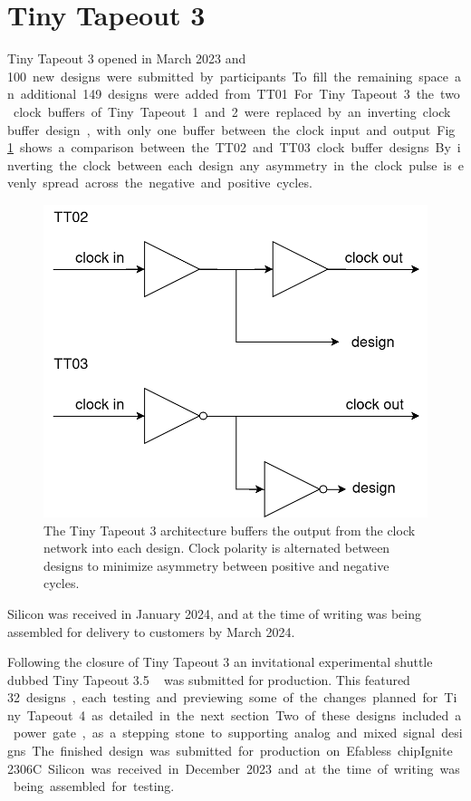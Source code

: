 \section{Tiny Tapeout 3}
\label{sec:tinytapeout3}

Tiny Tapeout 3 opened in March 2023 and \qty{100} new designs were submitted by participants. To fill the remaining space an additional \qty{149} designs were added from TT01.

For Tiny Tapeout 3 the two clock buffers of Tiny Tapeout 1 and 2 were replaced by an inverting clock buffer design, with only one buffer between the clock input and output. Fig. ~\ref{fig:TT02_vs_TT03} shows a comparison between the TT02 and TT03 clock buffer designs. By inverting the clock between each design any asymmetry in the clock pulse is evenly spread across the negative and positive cycles.

\begin{figure}[!t]
\centering
\includegraphics[width=\columnwidth]{./Figs/tt02 vs tt03 scanchain clock.png}
\caption{The Tiny Tapeout 3 architecture buffers the output from the clock network into each design. Clock polarity is alternated between designs to minimize asymmetry between positive and negative cycles.}
\label{fig:TT02_vs_TT03}
\end{figure}

Silicon was received in January 2024, and at the time of writing was being assembled for delivery to customers by March 2024.

Following the closure of Tiny Tapeout 3 an invitational experimental shuttle dubbed Tiny Tapeout 3.5 ~\cite{tinytapeout03p5} was submitted for production. This featured \qty{32} designs, each testing and previewing some of the changes planned for Tiny Tapeout 4 as detailed in the next section. Two of these designs included a power gate, as a stepping stone to supporting analog and mixed signal designs.

The finished design was submitted for production on Efabless chipIgnite 2306C.
Silicon was received in December 2023 and at the time of writing was being assembled for testing.
